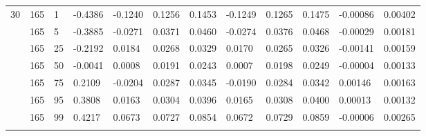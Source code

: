 \begin{longtable}{llllllllllll}
30 & 165 & 1 & -0.4386 & -0.1240 & 0.1256 & 0.1453 & -0.1249 & 0.1265 & 0.1475 & -0.00086 & 0.00402 \\ \addlinespace[3pt]
30 & 165 & 5 & -0.3885 & -0.0271 & 0.0371 & 0.0460 & -0.0274 & 0.0376 & 0.0468 & -0.00029 & 0.00181 \\ \addlinespace[3pt]
30 & 165 & 25 & -0.2192 & 0.0184 & 0.0268 & 0.0329 & 0.0170 & 0.0265 & 0.0326 & -0.00141 & 0.00159 \\ \addlinespace[3pt]
30 & 165 & 50 & -0.0041 & 0.0008 & 0.0191 & 0.0243 & 0.0007 & 0.0198 & 0.0249 & -0.00004 & 0.00133 \\ \addlinespace[3pt]
30 & 165 & 75 & 0.2109 & -0.0204 & 0.0287 & 0.0345 & -0.0190 & 0.0284 & 0.0342 & 0.00146 & 0.00163 \\ \addlinespace[3pt]
30 & 165 & 95 & 0.3808 & 0.0163 & 0.0304 & 0.0396 & 0.0165 & 0.0308 & 0.0400 & 0.00013 & 0.00132 \\ \addlinespace[3pt]
30 & 165 & 99 & 0.4217 & 0.0673 & 0.0727 & 0.0854 & 0.0672 & 0.0729 & 0.0859 & -0.00006 & 0.00265 \\ \addlinespace[3pt]
\bottomrule\end{longtable}
